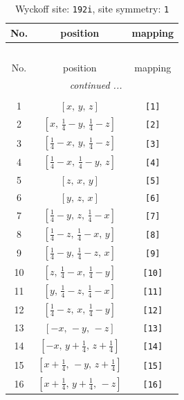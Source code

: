 \documentclass[fleqn,8pt]{jsarticle}
\begin{document}
\begin{longtable}{ccc}
\caption{Wyckoff site: {\tt 192i}, site symmetry: {\tt 1}}
 \\
 \hline \hline
No. & position & mapping \\ \hline \endfirsthead

\multicolumn{2}{l}{\tablename\ \thetable{}} \\
 \hline \hline
No. & position & mapping \\ \hline \endhead

 \hline \hline
\multicolumn{2}{r}{\footnotesize\it continued ...} \\ \endfoot

 \hline \hline
\multicolumn{2}{r}{} \\ \endlastfoot

1 & $\left[ x,\, y,\, z \right]$ & {\tt [1]} \\ \hline
2 & $\left[ x,\, \frac{1}{4} - y,\, \frac{1}{4} - z \right]$ & {\tt [2]} \\ \hline
3 & $\left[ \frac{1}{4} - x,\, y,\, \frac{1}{4} - z \right]$ & {\tt [3]} \\ \hline
4 & $\left[ \frac{1}{4} - x,\, \frac{1}{4} - y,\, z \right]$ & {\tt [4]} \\ \hline
5 & $\left[ z,\, x,\, y \right]$ & {\tt [5]} \\ \hline
6 & $\left[ y,\, z,\, x \right]$ & {\tt [6]} \\ \hline
7 & $\left[ \frac{1}{4} - y,\, z,\, \frac{1}{4} - x \right]$ & {\tt [7]} \\ \hline
8 & $\left[ \frac{1}{4} - z,\, \frac{1}{4} - x,\, y \right]$ & {\tt [8]} \\ \hline
9 & $\left[ \frac{1}{4} - y,\, \frac{1}{4} - z,\, x \right]$ & {\tt [9]} \\ \hline
10 & $\left[ z,\, \frac{1}{4} - x,\, \frac{1}{4} - y \right]$ & {\tt [10]} \\ \hline
11 & $\left[ y,\, \frac{1}{4} - z,\, \frac{1}{4} - x \right]$ & {\tt [11]} \\ \hline
12 & $\left[ \frac{1}{4} - z,\, x,\, \frac{1}{4} - y \right]$ & {\tt [12]} \\ \hline
13 & $\left[ - x,\, - y,\, - z \right]$ & {\tt [13]} \\ \hline
14 & $\left[ - x,\, y + \frac{1}{4},\, z + \frac{1}{4} \right]$ & {\tt [14]} \\ \hline
15 & $\left[ x + \frac{1}{4},\, - y,\, z + \frac{1}{4} \right]$ & {\tt [15]} \\ \hline
16 & $\left[ x + \frac{1}{4},\, y + \frac{1}{4},\, - z \right]$ & {\tt [16]} \\ \hline

\end{longtable}
\end{document}
